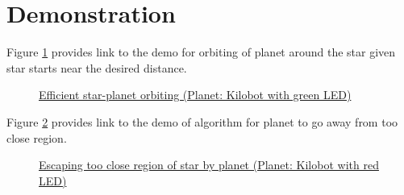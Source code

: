 \documentclass{report}[12pt]
\begin{document}
\section{Demonstration}
Figure \ref{fig:efficient_star_planet_orbiting} provides link to the demo for orbiting of planet around the star given star starts near the desired distance.
\begin{figure}[H]
    \centering
    \caption{\href{https://photos.app.goo.gl/A}{Efficient star-planet orbiting (Planet: Kilobot with green LED)}}
    \label{fig:efficient_star_planet_orbiting}
\end{figure}

Figure \ref{fig:escape_too_close} provides link to the demo of algorithm for planet to go away from too close region.
\begin{figure}[H]
    \centering
    \caption{\href{https://photos.app.goo.gl/no8unyVke2eyDXXT9}{Escaping too close region of star by planet (Planet: Kilobot with red LED)}}
    \label{fig:escape_too_close}
\end{figure}
\end{document}
